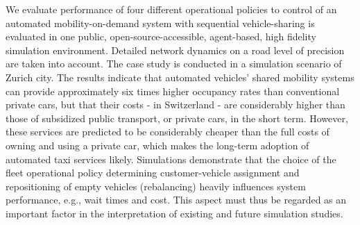 We evaluate performance of four different operational policies to control of an automated mobility-on-demand system with sequential vehicle-sharing is evaluated in one public, open-source-accessible,  agent-based, high fidelity simulation environment. Detailed network dynamics on a road level of precision are taken into account. The case study is conducted in a simulation scenario of Zurich city. The results indicate that automated vehicles’ shared mobility systems can provide approximately six times higher occupancy rates than conventional private cars, but that their costs - in Switzerland - are considerably higher than those of subsidized public transport, or private cars, in the short term. However, these services are predicted to be considerably cheaper than the full costs of owning and using a private car, which makes the long-term adoption of automated taxi services likely. Simulations demonstrate that the choice of the fleet operational policy determining customer-vehicle assignment and repositioning of empty vehicles (rebalancing) heavily influences system performance, e.g., wait times and cost. This aspect must thus be regarded as an important factor in the interpretation of existing and future simulation studies.